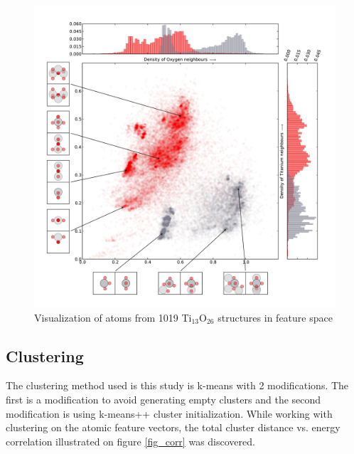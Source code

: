 \documentclass[%
 aps,
 prl,%
 amsmath,amssymb,
 reprint,%
]{revtex4-1}
\begin{document}
\begin{figure}[h]
    \centering
    \includegraphics[width=1.0\columnwidth]{fig1-scatterplot.pdf}
    \caption{Visualization of atoms from 1019 Ti$_{13}$O$_{26}$ structures in feature space}
    \label{fig1}
\end{figure}


\subsection{Clustering}
The clustering method used is this study is k-means with 2
modifications. The first is a modification to avoid generating empty
clusters \cite{Malay2009} and the second modification is using
k-means++ cluster initialization. While working with clustering on the
atomic feature vectors, the total cluster distance vs. energy correlation
illustrated on figure \ref{fig_corr} was discovered. 
\end{document}
